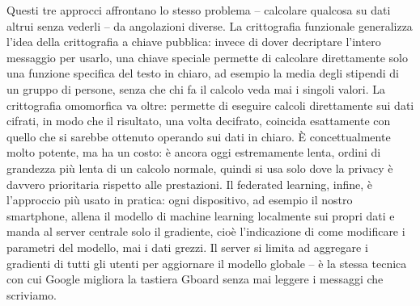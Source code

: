 \documentclass[a4paper,11pt]{article}
\begin{document}
\begin{center}
\end{center}

\begin{nota}
Questi tre approcci affrontano lo stesso problema -- calcolare qualcosa su dati altrui senza vederli -- da angolazioni diverse. La crittografia funzionale generalizza l'idea della crittografia a chiave pubblica: invece di dover decriptare l'intero messaggio per usarlo, una chiave speciale permette di calcolare direttamente solo una funzione specifica del testo in chiaro, ad esempio la media degli stipendi di un gruppo di persone, senza che chi fa il calcolo veda mai i singoli valori. La crittografia omomorfica va oltre: permette di eseguire calcoli direttamente sui dati cifrati, in modo che il risultato, una volta decifrato, coincida esattamente con quello che si sarebbe ottenuto operando sui dati in chiaro. È concettualmente molto potente, ma ha un costo: è ancora oggi estremamente lenta, ordini di grandezza più lenta di un calcolo normale, quindi si usa solo dove la privacy è davvero prioritaria rispetto alle prestazioni. Il federated learning, infine, è l'approccio più usato in pratica: ogni dispositivo, ad esempio il nostro smartphone, allena il modello di machine learning localmente sui propri dati e manda al server centrale solo il gradiente, cioè l'indicazione di come modificare i parametri del modello, mai i dati grezzi. Il server si limita ad aggregare i gradienti di tutti gli utenti per aggiornare il modello globale -- è la stessa tecnica con cui Google migliora la tastiera Gboard senza mai leggere i messaggi che scriviamo.
\end{nota}
\end{document}
